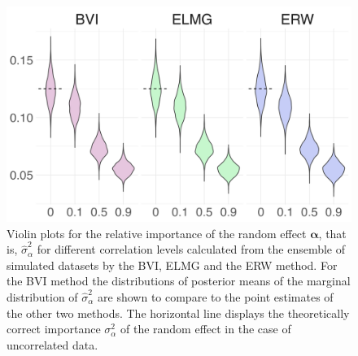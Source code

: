 \begin{figure}[ht]
  \centering
  \includegraphics[width=0.7\linewidth]{Figures/ViolinPlots/Variance_gamma.png}
  \caption[Relative importance of the random effect $\boldsymbol{\alpha}$ in Gaussian LMM]{Violin plots for the relative importance of the random effect $\boldsymbol{\alpha}$, that is, $\hat{\sigma}^2_{\alpha}$ for different correlation levels calculated from the ensemble of simulated datasets by the BVI, ELMG and the ERW method. For the BVI method the distributions of posterior means of the marginal distribution of $\hat{\sigma}^2_{\alpha}$ are shown to compare to the point estimates of the other two methods. The horizontal line displays the theoretically correct importance $\sigma^2_{\alpha}$ of the random effect in the case of uncorrelated data.}
  \label{fig:relimp_alpha}
\end{figure}


